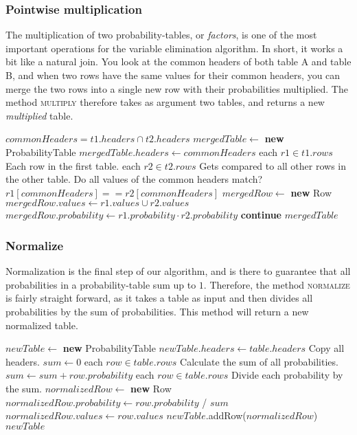 \documentclass[10pt,a4paper]{article}
\begin{document}
\subsubsection{Pointwise multiplication}
The multiplication of two probability-tables, or \emph{factors}, is one of the most important operations for the variable elimination algorithm. In short, it works a bit like a natural join. You look at the common headers of both table A and table B, and when two rows have the same values for their common headers, you can merge the two rows into a single new row with their probabilities multiplied. The method \textsc{multiply} therefore takes as argument two tables, and returns a new \emph{multiplied} table.
\begin{codebox}
\li $commonHeaders = t1.headers \cap t2.headers$
\li $mergedTable \gets $ \textbf{new} ProbabilityTable
\li $mergedTable.headers \gets commonHeaders$
\zi
\li \For each $r1 \in t1.rows$ \Comment Each row in the first table. \Do
\li     \For each $r2 \in t2.rows$ \Comment Gets compared to all other rows in the other table. \Do
\zi         \Comment Do all values of the common headers match?
\li         \If $r1[commonHeaders] == r2[commonHeaders]$ \Then
\li             $mergedRow \gets $ \textbf{new} Row
\li             $mergedRow.values \gets r1.values \cup r2.values$
\li             $mergedRow.probability \gets r1.probability \cdot r2.probability$
\li         \Else
\li             \textbf{continue}
            \End
        \End
    \End
\zi
\li \Return $mergedTable$
\end{codebox}
\subsubsection{Normalize}
Normalization is the final step of our algorithm, and is there to guarantee that all probabilities in a probability-table sum up to $1$. Therefore, the method \textsc{normalize} is fairly straight forward, as it takes a table as input and then divides all probabilities by the sum of probabilities. This method will return a new normalized table.
\begin{codebox}
\li $newTable \gets $ \textbf{new} ProbabilityTable
\li $newTable.headers \gets table.headers$ \Comment Copy all headers.
\li $sum \gets 0$
\li \For each $row \in table.rows$ \Comment Calculate the sum of all probabilities. \Do
\li     $sum \gets sum + row.probability$
    \End
\li \For each $row \in table.rows$ \Comment Divide each probability by the sum. \Do
\li     $normalizedRow \gets $ \textbf{new} Row
\li     $normalizedRow.probability \gets row.probability$ / $sum$
\li     $normalizedRow.values \gets row.values$
\li     $newTable$.{\sc addRow}($normalizedRow$)
    \End
\li \Return $newTable$
\end{codebox}
\end{document}

